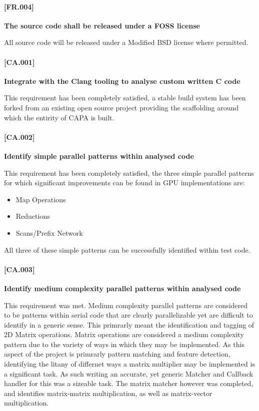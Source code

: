 \paragraph{[FR.004]}
\textbf{The source code shall be released under a FOSS license}

All source code will be released under a Modified BSD license where permitted.


\paragraph{[CA.001]}
\textbf{Integrate with the Clang tooling to analyse custom written C code}

This requirement has been completely satisfied, a stable build system has been forked from an
existing open source project providing the scaffolding around which the entirity of CAPA is built.

\paragraph{[CA.002]}
\textbf{Identify simple parallel patterns within analysed code}

This requirement has been completely satisfied, the three simple parallel patterns for which
significant improvements can be found in GPU implementations are:

\begin{itemize}
\item Map Operations
\item Reductions
\item Scans/Prefix Network
\end{itemize}

All three of these simple patterns can be successfully identified within test code.

\paragraph{[CA.003]}
\textbf{Identify medium complexity parallel patterns within analysed code}

This requirement was met. Medium complexity parallel patterns are considered to be patterns within serial code that are
clearly parallelizable yet are difficult to identify in a generic sense. This primrarly meant the
identification and tagging of 2D Matrix operations. Matrix operations are considered a medium
complexity pattern due to the variety of ways in which they may be implemented. As this aspect of
the project is primrarly pattern matching and feature detection, identifying the litany of differnet
ways a matrix multiplier may be implemented is a significant task. As such writing an accurate, yet
generic Matcher and Callback handler for this was a sizeable task. The matrix matcher however was
completed, and identifies matrix-matrix multiplication, as well as matrix-vector multiplication. 

